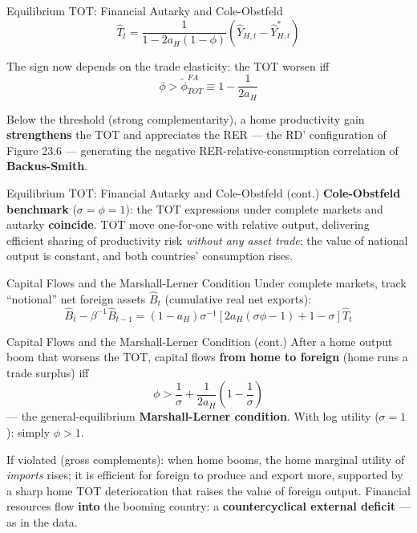 \documentclass[blue]{beamer}
\begin{document}
\begin{frame}{Equilibrium TOT: Financial Autarky and Cole-Obstfeld}
\[
\hat{T}_t = \frac{1}{1 - 2a_H(1-\phi)}\left(\hat{Y}_{H,t} - \hat{Y}^*_{H,t}\right)
\]

The sign now depends on the trade elasticity: the TOT worsen iff
\[
\phi > \tilde{\phi}^{FA}_{TOT} \equiv 1 - \frac{1}{2a_H}
\]

Below the threshold (strong complementarity), a home productivity gain \textbf{strengthens} the TOT and appreciates the RER --- the RD' configuration of Figure 23.6 --- generating the negative RER-relative-consumption correlation of \textbf{Backus-Smith}.

\end{frame}

\begin{frame}{Equilibrium TOT: Financial Autarky and Cole-Obstfeld (cont.)}
\bigskip
\textbf{Cole-Obstfeld benchmark} ($\sigma = \phi = 1$): the TOT expressions under complete markets and autarky \textbf{coincide}. TOT move one-for-one with relative output, delivering efficient sharing of productivity risk \emph{without any asset trade}: the value of national output is constant, and both countries' consumption rises.
\end{frame}

\begin{frame}{Capital Flows and the Marshall-Lerner Condition}
Under complete markets, track ``notional'' net foreign assets $\hat{B}_t$ (cumulative real net exports):
\[
\hat{B}_t - \beta^{-1}\hat{B}_{t-1} = (1-a_H)\sigma^{-1}\left[2a_H(\sigma\phi - 1) + 1 - \sigma\right]\hat{T}_t
\]

\end{frame}

\begin{frame}{Capital Flows and the Marshall-Lerner Condition (cont.)}
After a home output boom that worsens the TOT, capital flows \textbf{from home to foreign} (home runs a trade surplus) iff
\[
\phi > \frac{1}{\sigma} + \frac{1}{2a_H}\left(1 - \frac{1}{\sigma}\right)
\]
--- the general-equilibrium \textbf{Marshall-Lerner condition}. With log utility ($\sigma = 1$): simply $\phi > 1$.

\bigskip
If violated (gross complements): when home booms, the home marginal utility of \emph{imports} rises; it is efficient for foreign to produce and export more, supported by a sharp home TOT deterioration that raises the value of foreign output. Financial resources flow \textbf{into} the booming country: a \textbf{countercyclical external deficit} --- as in the data.
\end{frame}
\end{document}

